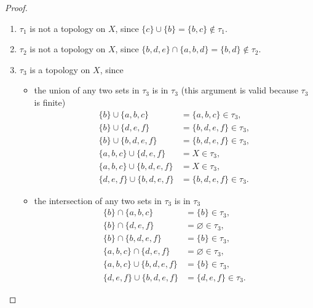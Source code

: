 \begin{proof}
	\begin{enumerate}[label={(\alph*)}]
		\item $\tau_{1}$ is not a topology on $X$, since $\{ c \}\cup\{ b \} = \{ b, c \}\notin \tau_{1}$.
		\item $\tau_{2}$ is not a topology on $X$, since $\{ b, d, e \}\cap \{ a, b, d \} = \{ b, d \}\notin\tau_{2}$.
		\item $\tau_{3}$ is a topology on $X$, since
		      \begin{itemize}
			      \item the union of any two sets in $\tau_{3}$ is in $\tau_{3}$ (this argument is valid because $\tau_{3}$ is finite)
			            \begin{align*}
				            \{ b \} \cup \{ a, b, c \}          & = \{ a, b, c \}\in \tau_{3},    \\
				            \{ b \} \cup \{ d, e, f \}          & = \{ b, d, e, f \}\in \tau_{3}, \\
				            \{ b \} \cup \{ b, d, e, f \}       & = \{ b, d, e, f \}\in \tau_{3}, \\
				            \{ a, b, c \} \cup \{ d, e, f \}    & = X\in \tau_{3},                \\
				            \{ a, b, c \} \cup \{ b, d, e, f \} & = X\in \tau_{3},                \\
				            \{ d, e, f \} \cup \{ b, d, e, f \} & = \{ b, d, e, f \}\in \tau_{3}.
			            \end{align*}
			      \item the intersection of any two sets in $\tau_{3}$ is in $\tau_{3}$
			            \begin{align*}
				            \{ b \} \cap \{ a, b, c \}          & = \{ b \}\in \tau_{3},       \\
				            \{ b \} \cap \{ d, e, f \}          & = \varnothing\in \tau_{3},   \\
				            \{ b \} \cap \{ b, d, e, f \}       & = \{ b \}\in \tau_{3},       \\
				            \{ a, b, c \} \cap \{ d, e, f \}    & = \varnothing\in \tau_{3},   \\
				            \{ a, b, c \} \cup \{ b, d, e, f \} & = \{ b \}\in \tau_{3},       \\
				            \{ d, e, f \} \cup \{ b, d, e, f \} & = \{ d, e, f \}\in \tau_{3}.
			            \end{align*}
		      \end{itemize}
	\end{enumerate}
\end{proof}
\newpage

